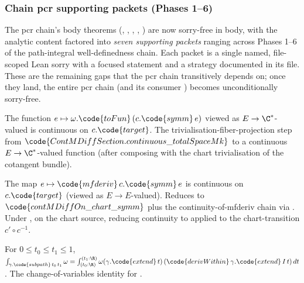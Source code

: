 \subsubsection*{Chain pcr supporting packets (Phases 1--6)}

The pcr chain's body theorems
(,
,
,
,
)
are now sorry-free in body, with the analytic content
factored into \emph{seven supporting packets} ranging across
Phases 1--6 of the path-integral well-definedness chain.  Each
packet is a single named, file-scoped Lean sorry with a focused
statement and a strategy documented in its file.  These are the
remaining gaps that the pcr chain transitively depends on; once
they land, the entire pcr chain (and its consumer
) becomes
unconditionally sorry-free.

\begin{lemma}
\label{lem:pcr-phase-1a}
The function $e \mapsto \omega.\code{toFun}\,(c.\code{symm}\,e)$
viewed as $E\to\C^{*}$-valued is continuous on $c.\code{target}$.
The trivialisation-fiber-projection step from
$\code{ContMDiffSection.continuous\_totalSpaceMk}$ to a continuous
$E\to\C^{*}$-valued function (after composing with the chart
trivialisation of the cotangent bundle).
\leanok
\end{lemma}

\begin{lemma}
\label{lem:pcr-phase-1b}
The map $e\mapsto\code{mfderiv}\,c.\code{symm}\,e$ is continuous on
$c.\code{target}$ (viewed as $E\to E$-valued).  Reduces to
$\code{contMDiffOn\_chart\_symm}$ plus the continuity-of-mfderiv
chain via .
Under \code{[StableChartAt E X]},  on the
chart source, reducing continuity to 
applied to the chart-transition $c'\circ c^{-1}$.
\leanok
\end{lemma}

\begin{lemma}
\label{lem:pcr-phase-2}
For $0\leq t_{0}\leq t_{1}\leq 1$,
$\int_{\gamma.\code{subpath}\,t_{0}\,t_{1}}\omega
= \int_{(t_{0}:\R)}^{(t_{1}:\R)}\omega(\gamma.\code{extend}\,t)\,
(\code{derivWithin}\,\gamma.\code{extend}\,I\,t)\,dt$.
The change-of-variables identity for .
\leanok
\end{lemma}


